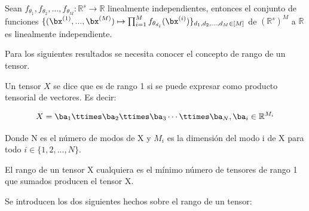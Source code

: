 \begin{lema} \label{lem:independenciaProductoFunciones}
Sean $f_{\theta_1},f_{\theta_2},... ,f_{\theta_M}:\mathbb{R}^s\rightarrow\mathbb{R}$ linealmente independientes, entonces el conjunto de funciones $\{(\bx^{(1)},... ,\bx^{(M)}) \mapsto \prod_{i=1}^{M}f_{\theta_{d_i}}(\bx^{(i)}) \}_{d_1,d_2,... ,d_M\in[M]}$ de $(\mathbb{R}^s)^M$ a $\mathbb{R}$ es linealmente independiente.
\end{lema}

Para los siguientes resultados se necesita conocer el concepto de rango de un tensor.

\begin{definicion} \label{def:rangoTensor}
Un tensor $X$ se dice que es de rango 1 si se puede expresar como producto tensorial de vectores. Es decir:

\begin{equation*}
X = \ba_1 \ttimes \ba_2 \ttimes \ba_3 \cdots  \ttimes \ba_N, \\ \ba_i \in \mathbb{R}^{M_i}
\end{equation*}

Donde N es el número de modos de X y $M_i$ es la dimensión del modo i de X para todo $i \in \{1,2,... ,N\}$.
\end{definicion}

\begin{definicion}
El rango de un tensor X cualquiera es el mínimo número de tensores de rango 1 que sumados producen el tensor X.
\end{definicion}


Se introducen los dos siguientes hechos sobre el rango de un tensor:

